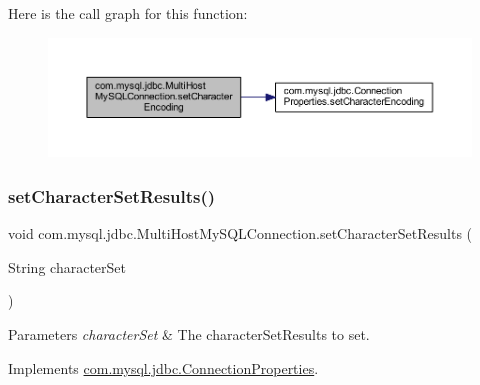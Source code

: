 Here is the call graph for this function\+:
\nopagebreak
\begin{figure}[H]
\begin{center}
\leavevmode
\includegraphics[width=350pt]{classcom_1_1mysql_1_1jdbc_1_1_multi_host_my_s_q_l_connection_a1510cc6e9c664cb49832bb26ae148e06_cgraph}
\end{center}
\end{figure}
\mbox{\label{classcom_1_1mysql_1_1jdbc_1_1_multi_host_my_s_q_l_connection_a5fa2549fbd789689d65411226fc16101}} 
\subsubsection{\texorpdfstring{set\+Character\+Set\+Results()}{setCharacterSetResults()}}
{\footnotesize\ttfamily void com.\+mysql.\+jdbc.\+Multi\+Host\+My\+S\+Q\+L\+Connection.\+set\+Character\+Set\+Results (\begin{DoxyParamCaption}\item[{String}]{character\+Set }\end{DoxyParamCaption})}


\begin{DoxyParams}{Parameters}
{\em character\+Set} & The character\+Set\+Results to set. \\
\hline
\end{DoxyParams}


Implements \mbox{\hyperlink{interfacecom_1_1mysql_1_1jdbc_1_1_connection_properties_a8279ffd124fca779625e5d1d94f32c56}{com.\+mysql.\+jdbc.\+Connection\+Properties}}.

